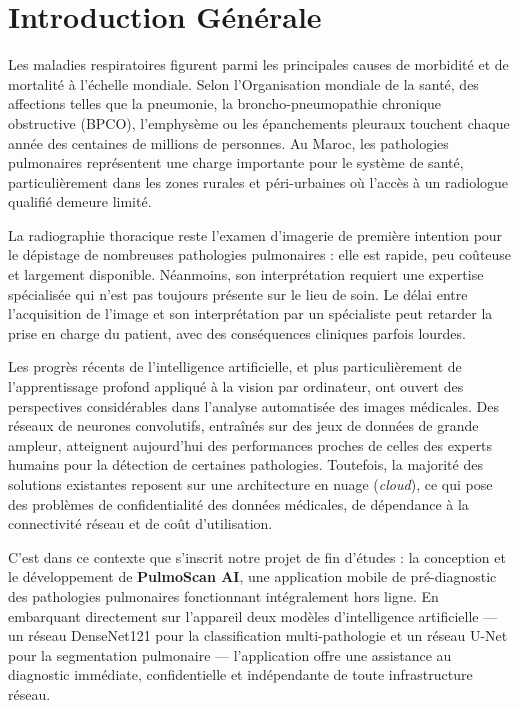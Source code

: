 \documentclass[12pt,a4paper]{report}
\begin{document}
\chapter*{Introduction Générale}

Les maladies respiratoires figurent parmi les principales causes de morbidité et de mortalité à l'échelle mondiale. Selon l'Organisation mondiale de la santé, des affections telles que la pneumonie, la broncho-pneumopathie chronique obstructive (BPCO), l'emphysème ou les épanchements pleuraux touchent chaque année des centaines de millions de personnes. Au Maroc, les pathologies pulmonaires représentent une charge importante pour le système de santé, particulièrement dans les zones rurales et péri-urbaines où l'accès à un radiologue qualifié demeure limité.

\bigskip
La radiographie thoracique reste l'examen d'imagerie de première intention pour le dépistage de nombreuses pathologies pulmonaires : elle est rapide, peu coûteuse et largement disponible. Néanmoins, son interprétation requiert une expertise spécialisée qui n'est pas toujours présente sur le lieu de soin. Le délai entre l'acquisition de l'image et son interprétation par un spécialiste peut retarder la prise en charge du patient, avec des conséquences cliniques parfois lourdes.

\bigskip
Les progrès récents de l'intelligence artificielle, et plus particulièrement de l'apprentissage profond appliqué à la vision par ordinateur, ont ouvert des perspectives considérables dans l'analyse automatisée des images médicales. Des réseaux de neurones convolutifs, entraînés sur des jeux de données de grande ampleur, atteignent aujourd'hui des performances proches de celles des experts humains pour la détection de certaines pathologies. Toutefois, la majorité des solutions existantes reposent sur une architecture en nuage (\textit{cloud}), ce qui pose des problèmes de confidentialité des données médicales, de dépendance à la connectivité réseau et de coût d'utilisation.

\bigskip
C'est dans ce contexte que s'inscrit notre projet de fin d'études : la conception et le développement de \textbf{PulmoScan AI}, une application mobile de pré-diagnostic des pathologies pulmonaires fonctionnant intégralement hors ligne. En embarquant directement sur l'appareil deux modèles d'intelligence artificielle --- un réseau DenseNet121 pour la classification multi-pathologie et un réseau U-Net pour la segmentation pulmonaire --- l'application offre une assistance au diagnostic immédiate, confidentielle et indépendante de toute infrastructure réseau.
\end{document}
